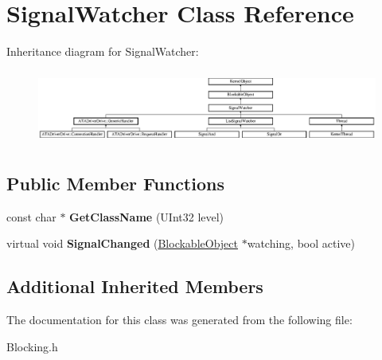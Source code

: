 \hypertarget{class_signal_watcher}{}\section{Signal\+Watcher Class Reference}
\label{class_signal_watcher}
Inheritance diagram for Signal\+Watcher\+:\begin{figure}[H]
\begin{center}
\leavevmode
\includegraphics[height=2.466960cm]{class_signal_watcher}
\end{center}
\end{figure}
\subsection*{Public Member Functions}
\begin{DoxyCompactItemize}
\item 
\mbox{\label{class_signal_watcher_adfb1c338cd85ca613989151a698be6ca}} 
const char $\ast$ {\bfseries Get\+Class\+Name} (U\+Int32 level)
\item 
\mbox{\label{class_signal_watcher_aa263cac3bd04b5fa141e8774fac8c4f9}} 
virtual void {\bfseries Signal\+Changed} (\hyperlink{class_blockable_object}{Blockable\+Object} $\ast$watching, bool active)
\end{DoxyCompactItemize}
\subsection*{Additional Inherited Members}


The documentation for this class was generated from the following file\+:\begin{DoxyCompactItemize}
\item 
Blocking.\+h\end{DoxyCompactItemize}
